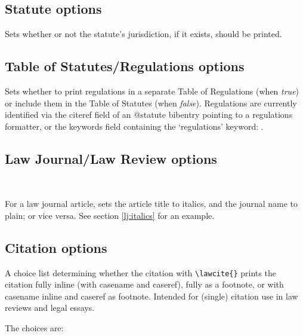 \subsection{Statute options}


Sets whether or not the statute's jurisdiction, if it exists, should be printed.
\bigskip

\subsection{Table of Statutes/Regulations options}


Sets whether to print regulations in a separate Table of Regulations (when \textit{true}) or include them in the Table of Statutes (when \textit{false}). Regulations are currently identified via the citeref field of an @statute bibentry pointing to a regulations formatter, or the keywords field containing the `regulations' keyword: .
\bigskip



\subsection{Law Journal/Law Review options}

\\

\label{c:ljitalmode}For a law journal article, sets the article title to italics, and the journal name to plain; or vice versa. See section \autoref{lj:italics} for an example.
\bigskip






\subsection{Citation options}


A choice list determining whether the citation with \texttt{\textbackslash lawcite\{\}} prints the citation fully inline (with casename and caseref), fully as a footnote, or with casename inline and caseref as footnote. Intended for (single) citation use in law reviews and legal essays.

The choices are:

